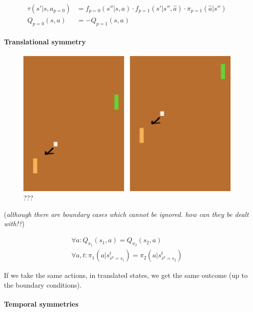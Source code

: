 \begin{align}
\tau(s'|s, a_{p=0}) &= f_{p=0}(s''|s, a) \cdot f_{p=1}(s'|s'', \hat a) \cdot \pi_{p=1}(\hat a|s'') \\
Q_{p=0}(s, a) &= -Q_{p=1}(s, a)
\end{align}

\hypertarget{translational-symmetry-1}{%
\paragraph{Translational symmetry}\label{translational-symmetry-1}}

\begin{figure}
\centering
\includegraphics[width=1\textwidth,height=0.25\textheight]{../../pictures/drawings/pong-trans.png}
\caption{???}
\end{figure}

(\emph{although there are boundary cases which cannot be ignored. how
can they be dealt with!?})

\begin{align}
\forall a: Q_{\pi_1}(s_1, a) = Q_{\pi_2}(s_2, a) \\
\forall a, t: \pi_1(a|s^t_{s^0=s_1}) = \pi_2(a|s^t_{s^0=s_2})
\end{align}

If we take the same actions, in translated states, we get the same
outcome (up to the boundary conditions).

\hypertarget{temporal-symmetries}{%
\paragraph{Temporal symmetries}\label{temporal-symmetries}}


